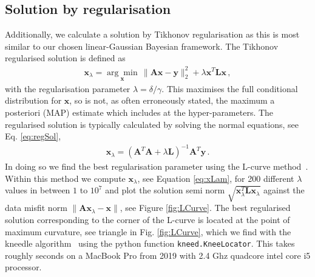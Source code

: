 \subsection{Solution by regularisation}
\label{subsec:reg}
Additionally, we calculate a solution by Tikhonov regularisation as this is most similar to our chosen linear-Gaussian Bayesian framework.
The Tikhonov regularised solution is defined as~\cite{hansen2010discrete} 
\begin{align}
	\bm{x}_{\lambda} =\underset{ \bm{x}}{\arg \min}\,  \lVert \bm{A}\bm{x} - \bm{y} \rVert_2^2 + \lambda \bm{x}^T \bm{L} \bm{x} \, ,
	\label{eq:XLam}
\end{align}
with the regularisation parameter $\lambda = \delta / \gamma$.
This maximises the full conditional distribution for $\bm{x}$, so is not, as often erroneously stated, the maximum a posteriori (MAP) estimate which includes at the hyper-parameters.
The regularised solution is typically calculated by solving the normal equations, see Eq. \ref{eq:regSol},
\begin{align}
	\bm{x}_{\lambda} = (\bm{A}^T\bm{A} + \lambda \bm{L} )^{-1} \bm{A}^T \bm{y} \label{eq:xLam} \, .
\end{align}
In doing so we find the best regularisation parameter using the L-curve method~\cite{hansen1993use}.
Within this method we compute $\bm{x}_\lambda$, see Equation \eqref{eq:xLam}, for 200 different $\lambda$ values in between $1$ to $10^7$ and plot the solution semi norm $\sqrt{\bm{x}_\lambda^T\mathbf{L} \bm{x}_\lambda}$ against the data misfit norm $\lVert \bm{A}\bm{x}_\lambda - \bm{x} \rVert$, see Figure \ref{fig:LCurve}. 
The best regularised solution corresponding to the corner of the L-curve is located at the point of maximum curvature, see triangle in Fig. \ref{fig:LCurve}, which we find with the kneedle algorithm~\cite{satopaa2011kneedle} using the python function \texttt{kneed.KneeLocator}.
This takes roughly seconds on a MacBook Pro from 2019 with 2.4 Ghz quadcore intel core i5 processor.
